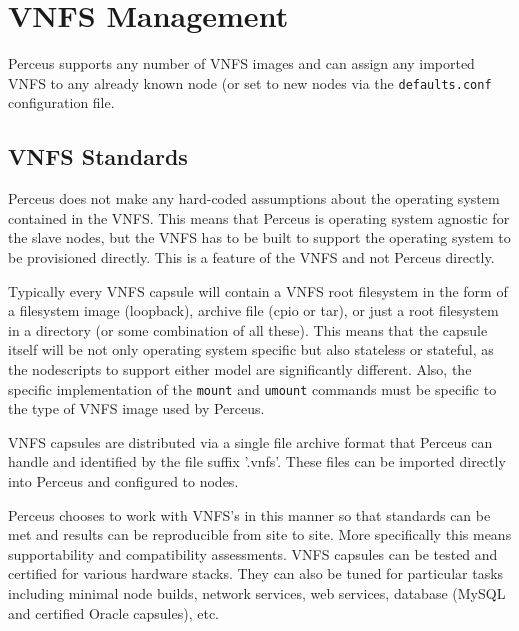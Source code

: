 \documentclass[10pt,letterpaper]{report}
\begin{document}
\section{VNFS Management}

Perceus supports any number of VNFS images and can assign any imported VNFS to
any already known node (or set to new nodes via the {\tt defaults.conf}
configuration file.




\subsection{VNFS Standards}

Perceus does not make any hard-coded assumptions about the operating
system contained in the VNFS.  This means that Perceus is operating system
agnostic for the slave nodes, but the VNFS has to be built to support the
operating system to be provisioned directly.  This is a feature of the VNFS and
not Perceus directly.

Typically every VNFS capsule will contain a VNFS root filesystem in the form
of a filesystem image (loopback), archive file (cpio or tar), or just a root
filesystem in a directory (or some combination of all these).  This means that
the capsule itself will be not only operating system specific but also
stateless or stateful, as the nodescripts to support either model are
significantly different.  Also, the specific implementation of the {\tt mount}
and {\tt umount} commands must be specific to the type of VNFS image used by
Perceus.

VNFS capsules are distributed via a single file archive format that Perceus
can handle and identified by the file suffix '.vnfs'.  These files can be
imported directly into Perceus and configured to nodes.

Perceus chooses to work with VNFS's in this manner so that standards can be
met and results can be reproducible from site to site.  More specifically this
means supportability and compatibility assessments.  VNFS capsules can be
tested and certified for various hardware stacks.  They can also be tuned for
particular tasks including minimal node builds, network services, web
services, database (MySQL and certified Oracle capsules), etc.
\end{document}
